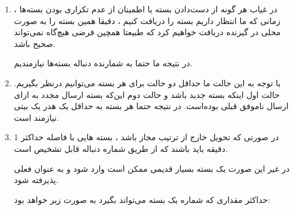 \begin{boxK}
    \begin{enumerate}
        \item 
        در غیاب هر گونه از دست‌دادن بسته یا اطمینان از عدم تکراری بودن بسته‌ها ، 
        زمانی که ما انتظار داریم بسته
        را دریافت کنیم ، دقیقا همین بسته را به صورت محلی در گیرنده دریافت خواهیم کرد که طبیعتا همچین فرضی هیچ‌گاه نمی‌تواند صحیح باشد.

        در نتیجه ما حتما به شمارنده دنباله بسته‌ها نیازمندیم.
        
        \item 
        با توجه به این حالت ما حداقل دو حالت برای هر بسته می‌توانیم درنظر بگیریم.
        حالت اول اینکه بسته جدید باشد و حالت دوم این‌که بسته ارسال مجدد به ازای ارسال ناموفق قبلی بوده‌است.
        در نتیجه حتما هر بسته به حداقل یک هدر یک بیتی نیازمند است.

        \item 

        در صورتی که تحویل خارج از ترتیب مجاز باشد ، 
بسته هایی با فاصله حداکثر 1 دقیقه باید باشند
که
از طریق شماره دنباله قابل تشخیص است.

در غیر این صورت یک بسته بسیار قدیمی ممکن است
وارد شود و به عنوان فعلی پذیرفته شود.

حداکثر مقداری که شماره یک بسته می‌تواند بگیرد به صورت زیر خواهد بود:
        
    \end{enumerate}
\end{boxK}